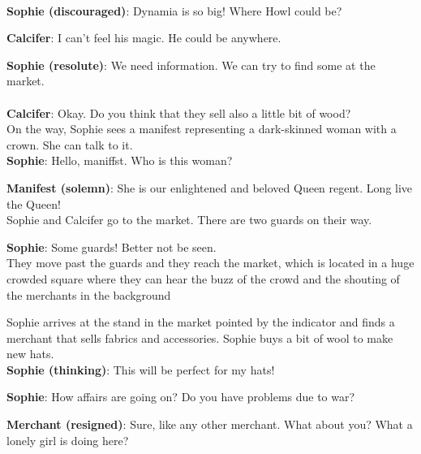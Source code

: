 \noindent \\

\textbf{Sophie (discouraged)}: Dynamia is so big! Where Howl could be?

\textbf{Calcifer}: I can’t feel his magic. He could be anywhere.

\textbf{Sophie (resolute)}: We need information. We can try to find some at the market. \\

\\

\textbf{Calcifer}: Okay. Do you think that they sell also a little bit of wood?\\

\noindent On the way, Sophie sees a manifest representing a dark-skinned woman with a crown. She can talk to it.\\

\textbf{Sophie}: Hello, maniffst. Who is this woman?

\textbf{Manifest (solemn)}: She is our enlightened and beloved Queen regent. Long live the Queen!\\

\noindent Sophie and Calcifer go to the market. There are two guards on their way.

\textbf{Sophie}: Some guards! Better not be seen.\\

\noindent They move past the guards and they reach the market, which is located in a huge crowded square where they can hear the buzz of the crowd and the shouting of the merchants in the background


\noindent Sophie arrives at the stand in the market pointed by the indicator and finds a merchant that sells fabrics and accessories.
Sophie buys a bit of wool to make new hats.\\

\textbf{Sophie (thinking)}: This will be perfect for my hats!

\textbf{Sophie}: How affairs are going on? Do you have problems due to war?

\textbf{Merchant (resigned)}: Sure, like any other merchant. What about you? What a lonely girl is doing here?\\

